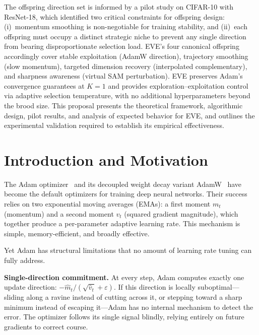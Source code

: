 \documentclass[12pt]{article}
\begin{document}
The offspring direction set is informed by a pilot study on CIFAR-10
with ResNet-18, which identified two critical constraints for offspring
design: (i)~momentum smoothing is non-negotiable for training
stability, and (ii)~each offspring must occupy a distinct strategic
niche to prevent any single direction from bearing disproportionate
selection load.
EVE's four canonical offspring accordingly cover stable exploitation
(AdamW direction), trajectory smoothing (slow momentum), targeted
dimension recovery (interpolated complementary), and sharpness
awareness (virtual SAM perturbation).
EVE preserves Adam's convergence guarantees at $K=1$ and provides
exploration--exploitation control via adaptive selection
temperature, with no additional hyperparameters beyond the brood size.
This proposal presents the theoretical framework, algorithmic design,
pilot results, and analysis of expected behavior for EVE, and outlines
the experimental validation required to establish its empirical
effectiveness.

\vspace{4pt}
\noindent{\color{rulecol}\rule{\linewidth}{0.6pt}}

\section{Introduction and Motivation}
\label{sec:intro}

The Adam optimizer~\cite{kingma2015adam} and its decoupled weight decay
variant AdamW~\cite{loshchilov2019decoupled} have become the default
optimizers for training deep neural networks.
Their success relies on two exponential moving averages (EMAs): a first
moment $m_t$ (momentum) and a second moment $v_t$ (squared gradient
magnitude), which together produce a per-parameter adaptive learning rate.
This mechanism is simple, memory-efficient, and broadly effective.

Yet Adam has structural limitations that no amount of learning rate
tuning can fully address.

\textbf{Single-direction commitment.}
At every step, Adam computes exactly one update direction:
$-\hat{m}_t / (\sqrt{\hat{v}_t} + \varepsilon)$.
If this direction is locally suboptimal---sliding along a ravine
instead of cutting across it, or stepping toward a sharp minimum
instead of escaping it---Adam has no internal mechanism to detect the
error.
The optimizer follows its single signal blindly, relying entirely on
future gradients to correct course.
\end{document}
